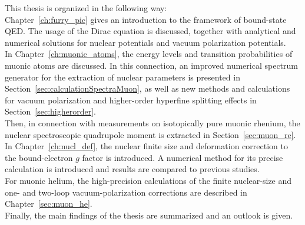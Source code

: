 This thesis is organized in the following way:\\
Chapter~\ref{ch:furry_pic} gives an introduction to the framework of bound-state QED. The usage of the Dirac equation is discussed, together with analytical and numerical solutions for nuclear potentials and vacuum polarization potentials.\\
In Chapter~\ref{ch:muonic_atoms}, the energy levels and transition probabilities of muonic atoms are discussed. In this connection, an improved numerical spectrum generator for the extraction of nuclear parameters is presented in Section~\ref{sec:calculationSpectraMuon}, as well as new methods and calculations for vacuum polarization and higher-order hyperfine splitting effects in Section~\ref{sec:higherorder}. \\
Then, in connection with measurements on isotopically pure muonic rhenium, the nuclear spectroscopic quadrupole moment is extracted in Section~\ref{sec:muon_re}.\\
In Chapter~\ref{ch:nucl_def}, the nuclear finite size and deformation correction to the bound-electron $g$ factor is introduced. A numerical method for its precise calculation is introduced and results are compared to previous studies.\\
For muonic helium, the high-precision calculations of the finite nuclear-size and one- and two-loop vacuum-polarization corrections are described in Chapter~\ref{sec:muon_he}.\\
Finally, the main findings of the thesis are summarized and an outlook is given.




































